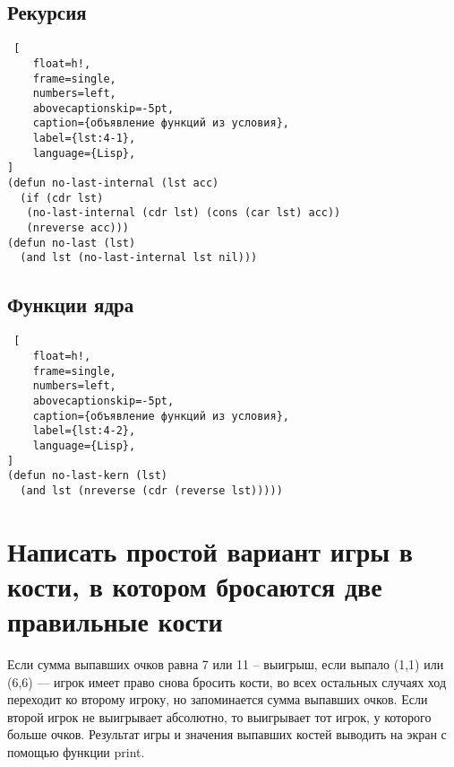 \subsection{Рекурсия}

\begin{lstlisting} [
	float=h!,
	frame=single,
	numbers=left,
	abovecaptionskip=-5pt,
	caption={объявление функций из условия},
	label={lst:4-1},
	language={Lisp},
]
(defun no-last-internal (lst acc)
  (if (cdr lst)
   (no-last-internal (cdr lst) (cons (car lst) acc))
   (nreverse acc)))
(defun no-last (lst)
  (and lst (no-last-internal lst nil)))
\end{lstlisting}

\subsection{Функции ядра}

\begin{lstlisting} [
	float=h!,
	frame=single,
	numbers=left,
	abovecaptionskip=-5pt,
	caption={объявление функций из условия},
	label={lst:4-2},
	language={Lisp},
]
(defun no-last-kern (lst)
  (and lst (nreverse (cdr (reverse lst)))))
\end{lstlisting}

\section{Написать простой вариант игры в кости, в котором бросаются две правильные кости}

Если сумма выпавших очков равна 7 или 11 -- выигрыш, если выпало (1,1) или (6,6) --- игрок имеет право снова бросить кости, во всех остальных случаях ход переходит ко второму игроку, но запоминается сумма выпавших очков. Если второй игрок не выигрывает абсолютно, то выигрывает тот игрок, у которого больше очков. Результат игры и значения выпавших костей выводить на экран с помощью функции print.

